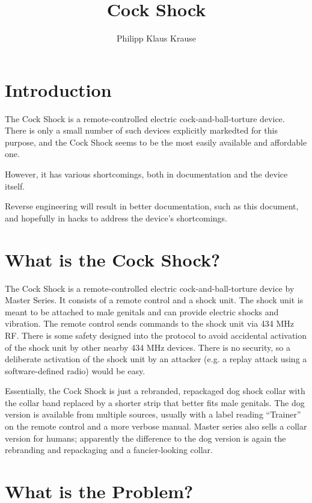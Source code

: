 \documentclass[a4paper]{article}
\begin{document}
\title{Cock Shock}
\author{Philipp Klaus Krause}

\maketitle

\section{Introduction}

The Cock Shock is a remote-controlled electric cock-and-ball-torture device. There is only a small number of such devices explicitly markedted for this purpose, and the Cock Shock seems to be the most easily available and affordable one.

However, it has various shortcomings, both in documentation and the device itself.

Reverse engineering will result in better documentation, such as this document, and hopefully in hacks to address the device's shortcomings.

\section{What is the Cock Shock?}

The Cock Shock is a remote-controlled electric cock-and-ball-torture device by Master Series. It consists of a remote control and a shock unit. The shock unit is meant to be attached to male genitals and can provide electric shocks and vibration. The remote control sends commands to the shock unit via 434 MHz RF. There is some safety designed into the protocol to avoid accidental activation of the shock unit by other nearby 434 MHz devices. There is no security, so a deliberate activation of the shock unit by an attacker (e.g. a replay attack using a software-defined radio) would be easy.

Essentially, the Cock Shock is just a rebranded, repackaged dog shock collar with the collar band replaced by a shorter strip that better fits male genitals. The dog version is available from multiple sources, usually with a label reading ``Trainer'' on the remote control and a more verbose manual. Master series also sells a collar version for humans; apparently the difference to the dog version is again the rebranding and repackaging and a fancier-looking collar.

\section{What is the Problem?}
\end{document}
